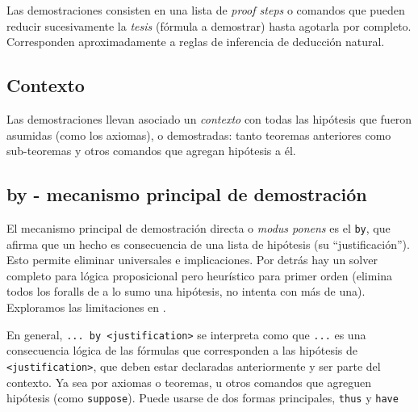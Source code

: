 Las demostraciones consisten en una lista de \textit{proof steps} o comandos que
pueden reducir sucesivamente la \textit{tesis} (fórmula a demostrar) hasta
agotarla por completo. Corresponden aproximadamente a reglas de inferencia de
deducción natural.

\subsection{Contexto}

Las demostraciones llevan asociado un \textit{contexto} con todas las hipótesis
que fueron asumidas (como los axiomas), o demostradas: tanto teoremas anteriores
como sub-teoremas y otros comandos que agregan hipótesis a él.

\subsection{by - mecanismo principal de demostración}

El mecanismo principal de demostración directa o \textit{modus ponens} es el
\lstinline{by}, que afirma que un hecho es consecuencia de una lista de
hipótesis (su ``justificación''). Esto permite eliminar universales e implicaciones. Por detrás hay un
solver completo para lógica proposicional pero heurístico para primer
orden (elimina todos los foralls de a lo sumo una hipótesis, no intenta con más
de una). Exploramos las limitaciones en .

En general, \texttt{... by <justification>} se interpreta como que \texttt{...}
es una consecuencia lógica de las fórmulas que corresponden a las hipótesis de
\texttt{<justification>}, que deben estar declaradas anteriormente y ser parte
del contexto. Ya sea por axiomas o teoremas, u otros comandos que agreguen
hipótesis (como \lstinline{suppose}). Puede usarse de dos formas principales,
\lstinline{thus} y \lstinline{have}

